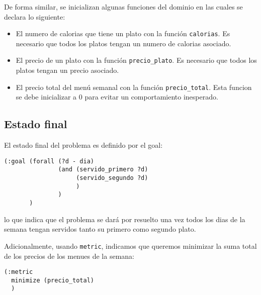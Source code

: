De forma similar, se inicializan algunas funciones del dominio en las cuales
se declara lo siguiente:
\begin{itemize}
  \item 
    El numero de calorias que tiene un plato con la función 
    \texttt{calorias}.
    Es necesario que todos los platos tengan un numero de calorias asociado.
  \item 
    El precio de un plato con la función
    \texttt{precio\_plato}.
    Es necesario que todos los platos tengan un precio asociado.
  \item 
    El precio total del menú semanal con la función
    \texttt{precio\_total}.
    Esta funcion se debe inicializar a 0 para evitar un comportamiento 
    inesperado.
\end{itemize}

\subsection{Estado final}

El estado final del problema es definido por el goal:

\begin{verbatim}
(:goal (forall (?d - dia)
               (and (servido_primero ?d)
                    (servido_segundo ?d)
                    )
               )
       )
\end{verbatim}

lo que indica que el problema se dará por resuelto una vez todos los dias
de la semana tengan servidos tanto su primero como segundo plato.

Adicionalmente, usando \texttt{metric}, indicamos que
queremos minimizar la suma 
total de los precios de los menues de la semana:

\begin{verbatim}
(:metric 
  minimize (precio_total)
  )
\end{verbatim}
